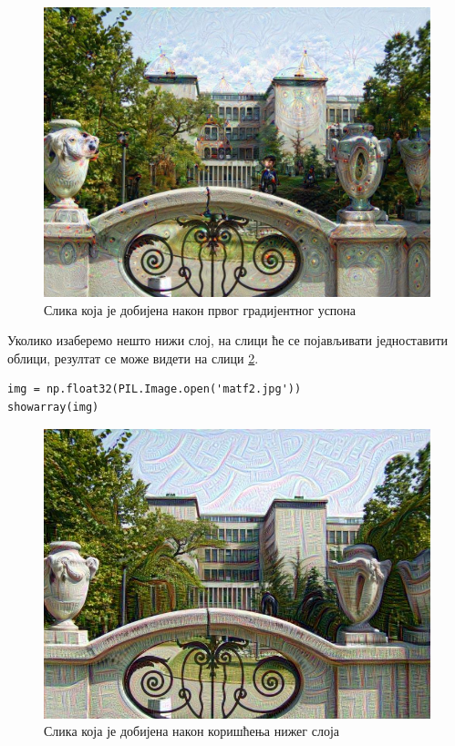 \documentclass[a4paper]{article}
\begin{document}
\begin{figure}[h!]
\begin{center}
    \includegraphics[width=\textwidth]{./resources/deepdreamnew1.jpg}
\end{center}
\caption{Слика која је добијена након првог градијентног успона}
\label{fig:dreamnew1}
\end{figure}

Уколико изаберемо нешто нижи слој, на слици ће се појављивати једноставити облици,
резултат се може видети на слици \ref{fig:dreamnew2}.

\begin{verbatim}
img = np.float32(PIL.Image.open('matf2.jpg'))
showarray(img)
\end{verbatim}

\begin{figure}[h!]
\begin{center}
    \includegraphics[width=\textwidth]{./resources/deepdreamnew2.jpg}
\end{center}
\caption{Слика која је добијена након коришћења нижег слоја}
\label{fig:dreamnew2}
\end{figure}
\end{document}
